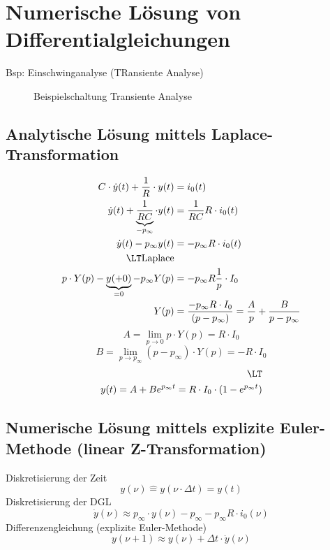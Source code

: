 \chapter{Numerische Lösung von Differentialgleichungen}
Bsp: Einschwinganalyse (TRansiente Analyse)

\begin{figure}
\center

\caption{Beispielschaltung Transiente Analyse}
\end{figure}

\section{Analytische Lösung mittels Laplace-Transformation}
\begin{equation}
\begin{split}
C\cdot\dot{y}(t) + \frac{1}{R}\cdot y(t) &= i_0(t)\\
\dot{y}(t) + \underbrace{\frac{1}{RC}}_{-p_\infty}\cdot y(t) &= \frac{1}{RC}R\cdot i_0(t)\\
\dot{y}(t) - p_\infty y(t) &= -p_\infty R\cdot i_0(t)\\
\LT \text{Laplace}\\
p\cdot Y(p) - \underbrace{y(+0)}_{=0} - p_\infty Y(p) &= -p_\infty R\frac{1}{p}\cdot I_0\\
Y(p) &= \frac{-p_\infty R\cdot I_0}{(p-p_\infty)} = \frac{A}{p} + \frac{B}{p-p_\infty}
\end{split}
\end{equation}
\begin{equation}
A = \lim\limits_{p\rightarrow 0} p\cdot Y(p) = R\cdot I_0
\end{equation}
\begin{equation}
B = \lim\limits_{p\rightarrow p_\infty} (p-p_\infty)\cdot Y(p) = -R\cdot I_0
\end{equation}
\begin{equation}
\begin{split}
\LT\\
y(t) = A + B e^{p_\infty t} = R\cdot I_0\cdot (1-e^{p_\infty t})
\end{split}
\end{equation}

\section{Numerische Lösung mittels explizite Euler-Methode (linear Z-Transformation)}
Diskretisierung der Zeit
\begin{equation}
y(\nu)\hat{=} y(\nu\cdot\Delta t) = y(t)
\end{equation}
Diskretisierung der DGL
\begin{equation}
\dot{y}(\nu)\approx p_\infty\cdot y(\nu) - p_\infty - p_\infty R\cdot i_0(\nu)
\end{equation}
Differenzengleichung (explizite Euler-Methode)
\begin{equation}
y(\nu+1)\approx y(\nu) + \Delta t\cdot\dot{y}(\nu)
\end{equation}

